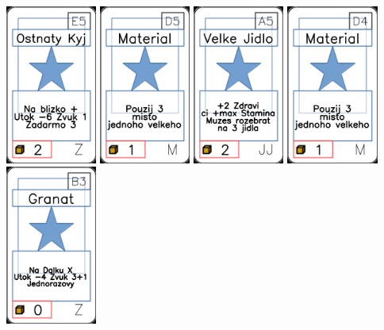 \documentclass[a4paper]{article}
\begin{document}
	\includegraphics[width=3.0cm]{img-1_84}
	\includegraphics[width=3.0cm]{img-1_49}
	\includegraphics[width=3.0cm]{img-1_34}
	\includegraphics[width=3.0cm]{img-1_48}
	\includegraphics[width=3.0cm]{img-1_97}
\end{document}

